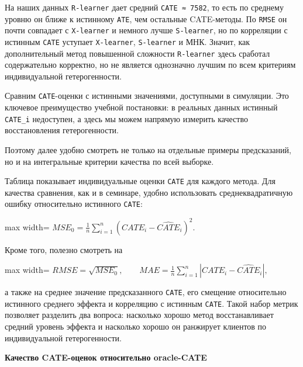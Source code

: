 \documentclass[11pt]{article}
\begin{document}
На наших данных \texttt{R-learner} дает средний \texttt{CATE\ ≈\ 7582},
то есть по среднему уровню он ближе к истинному \texttt{ATE}, чем
остальные CATE-методы. По \texttt{RMSE} он почти совпадает с
\texttt{X-learner} и немного лучше \texttt{S-learner}, но по корреляции
с истинным \texttt{CATE} уступает \texttt{X-learner}, \texttt{S-learner}
и МНК. Значит, как дополнительный метод повышенной сложности
\texttt{R-learner} здесь сработал содержательно корректно, но не
является однозначно лучшим по всем критериям индивидуальной
гетерогенности.

    Сравним \texttt{CATE}-оценки с истинными значениями, доступными в
симуляции. Это ключевое преимущество учебной постановки: в реальных
данных истинный \texttt{CATE\_i} недоступен, а здесь мы можем напрямую
измерить качество восстановления гетерогенности.

Поэтому далее удобно смотреть не только на отдельные примеры
предсказаний, но и на интегральные критерии качества по всей выборке.

    Таблица показывает индивидуальные оценки \texttt{CATE} для каждого
метода. Для качества сравнения, как и в семинаре, удобно использовать
среднеквадратичную ошибку относительно истинного \texttt{CATE}:

\begin{center}
\begin{adjustbox}{max width=\linewidth}
\(\displaystyle MSE_0 = \frac{1}{n}\sum\limits_{i=1}^{n}(CATE_i - \widehat{CATE}_i)^2.\)
\end{adjustbox}
\end{center}

Кроме того, полезно смотреть на

\begin{center}
\begin{adjustbox}{max width=\linewidth}
\(\displaystyle RMSE = \sqrt{MSE_0}, \qquad MAE = \frac{1}{n}\sum\limits_{i=1}^{n}|CATE_i - \widehat{CATE}_i|,\)
\end{adjustbox}
\end{center}

а также на среднее значение предсказанного \texttt{CATE}, его смещение
относительно истинного среднего эффекта и корреляцию с истинным
\texttt{CATE}. Такой набор метрик позволяет разделить два вопроса:
насколько хорошо метод восстанавливает средний уровень эффекта и
насколько хорошо он ранжирует клиентов по индивидуальной гетерогенности.

    \textbf{Качество CATE-оценок относительно oracle-CATE}
\end{document}
